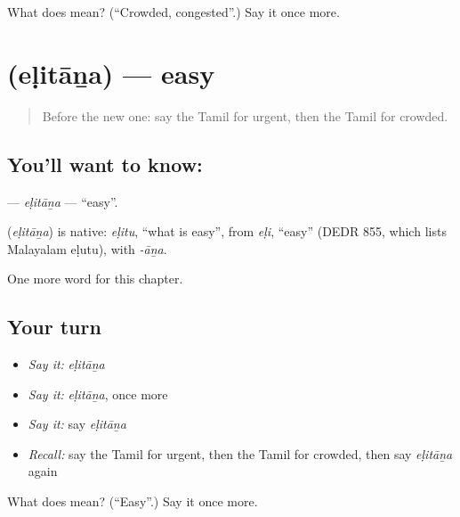 \begin{tcolorbox}[breakable,colback=teal!4,colframe=teal!35!black,title={Before you move on}]
What does  mean? (\textquotedblleft{}Crowded, congested\textquotedblright{}.) Say it once more.
\end{tcolorbox}
\section[\texorpdfstring{\ta{எளிதான} (eḷitāṉa)}{எளிதான (eḷitāṉa)}]{ (eḷitāṉa) — easy}

\label{lesson:TA-C267-elitana}



\begin{quote}
Before the new one: say the Tamil for urgent, then the Tamil for crowded.
\end{quote}

\subsection*{You'll want to know: }
\textbf{} — \emph{eḷitāṉa} — \textquotedblleft{}easy\textquotedblright{}.

\begin{cousinweb}
\textbf{} (\emph{eḷitāṉa}) is native: \emph{eḷitu}, \textquotedblleft{}what is easy\textquotedblright{}, from \emph{eḷi}, \textquotedblleft{}easy\textquotedblright{} (DEDR 855, which lists Malayalam eḷutu), with \emph{-āṉa}.
\end{cousinweb}

\begin{grammarlens}[title={What you've built}]
One more word for this chapter.
\end{grammarlens}

\subsection*{Your turn}
\begin{itemize}
\raggedright
  \item \emph{Say it:} \emph{eḷitāṉa}
  \item \emph{Say it:} \emph{eḷitāṉa}, once more
  \item \emph{Say it:} say \emph{eḷitāṉa}
  \item \emph{Recall:} say the Tamil for urgent, then the Tamil for crowded, then say \emph{eḷitāṉa} again
\end{itemize}

\begin{tcolorbox}[breakable,colback=teal!4,colframe=teal!35!black,title={Before you move on}]
What does  mean? (\textquotedblleft{}Easy\textquotedblright{}.) Say it once more.
\end{tcolorbox}
